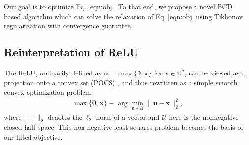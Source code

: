 \documentclass{article}
\begin{document}
    Our goal is to optimize Eq. \ref{eqn:obj}. To that end, we propose a novel BCD based algorithm which can solve the relaxation of Eq. \ref{eqn:obj} using Tikhonov regularization with convergence guarantee.
	
	
	
	
	\subsection{Reinterpretation of ReLU}
	
	The ReLU, ordinarily defined as $\mathbf{u}=\max\{\mathbf{0}, \mathbf{x}\}$ for  $\mathbf{x}\in\mathbb{R}^d$, can be viewed as a projection onto a convex set (POCS) \citet{bauschke1996projection}, and thus rewritten as a simple smooth convex optimization problem,
	\begin{align}\label{eqn:relu}
	\max\{\mathbf{0}, \mathbf{x}\} \equiv \arg\min_{\mathbf{u}\in\mathcal{U}}\|\mathbf{u}-\mathbf{x}\|_2^2,
	\end{align}
	where $\|\cdot\|_2$ denotes the $\ell_2$ norm of a vector and $\mathcal{U}$ here is the nonnegative closed half-space. This non-negative least squares problem becomes the basis of our lifted objective.
		
\end{document}
